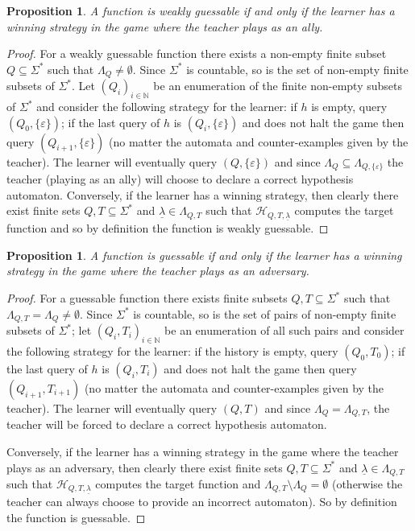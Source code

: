 \documentclass[10pt,a4paper]{amsart}
\newtheorem{prop}[thm]{Proposition}
\theoremstyle{definition}
\numberwithin{equation}{section}
\numberwithin{theorem}{section}
\begin{document}
\begin{prop}
A function is weakly guessable if and only if the learner has a winning strategy in the game where the teacher plays as an ally. 
\end{prop}

\begin{proof}
For a weakly guessable function there exists a non-empty finite subset $Q \subseteq \Sigma^*$ such that $\Lambda_{Q} \neq \emptyset$. Since $\Sigma^*$ is countable, so is the set of non-empty finite subsets of $\Sigma^*$. Let $(Q_i)_{i\in \mathbb{N}}$ be an enumeration of the finite non-empty subsets of $\Sigma^*$ and consider the following strategy for the learner: if $h$ is empty, query $(Q_0, \{\varepsilon\})$; if the last query of $h$ is $(Q_i, \{\varepsilon\})$ and does not halt the game then query $(Q_{i+1}, \{\varepsilon\})$ (no matter the automata and counter-examples given by the teacher). The learner will eventually query $(Q,\{\varepsilon\})$ and since $\Lambda_{Q} \subseteq \Lambda_{Q,\{\varepsilon\}}$ the teacher (playing as an ally) will choose to declare a correct hypothesis automaton. Conversely, if the learner has a winning strategy, then clearly there exist finite sets $Q, T \subseteq \Sigma^*$ and $\underline{\lambda} \in \Lambda_{Q, T}$ such that $\mathcal{H}_{Q, T, \underline{\lambda}}$ computes the target function and so by definition the function is weakly guessable.
\end{proof}

\begin{prop}
\label{prop:guessgame}A function is guessable if and only if the learner has a winning strategy in the game where the teacher plays as an adversary. 
\end{prop}

\begin{proof}
For a guessable function there exists finite subsets $Q, T \subseteq \Sigma^*$ such that $\Lambda_{Q,T} = \Lambda_{Q} \neq \emptyset$. Since $\Sigma^*$ is countable, so is the set of pairs of non-empty finite subsets of $\Sigma^*$; let $(Q_i, T_i)_{i\in \mathbb{N}}$ be an enumeration of all such pairs and consider the following strategy for the learner: if the history is empty, query  $(Q_0,T_0)$; if the last query of $h$ is $(Q_i, T_i)$ and does not halt the game then query $(Q_{i+1}, T_{i+1})$ (no matter the automata and counter-examples given by the teacher). The learner will eventually query $(Q,T)$ and since $\Lambda_{Q} = \Lambda_{Q,T}$, the teacher will be forced to declare a  correct hypothesis automaton.

Conversely, if the learner has a winning strategy in the game where the teacher plays as an adversary, then clearly there exist finite sets $Q, T \subseteq \Sigma^*$ and $\underline{\lambda} \in \Lambda_{Q, T}$ such that $\mathcal{H}_{Q, T, \underline{\lambda}}$ computes the target function and $\Lambda_{Q, T} \setminus \Lambda_Q = \emptyset$ (otherwise the teacher can always choose to provide an incorrect automaton). So by definition the function is guessable.
\end{proof}
\end{document}
